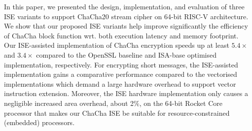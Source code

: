 In this paper, we presented the design, implementation, and evaluation of three ISE variants to support ChaCha20 stream cipher on 64-bit RISC-V architecture.
We show that our proposed ISE variants help improve significantly the efficiency of ChaCha block function wrt. both execution latency and memory footprint.  
Our ISE-assisted implementation of ChaCha encryption speeds up at least $5.4\times$ and $3.4\times$ compared to the OpenSSL baseline and ISA-base optimised implementation, respectively. 
For encrypting short messages, the ISE-assisted implementation gains a comparative performance compared to the vectorised implementations which demand a large hardware overhead to support vector instruction extension.
Moreover, the ISE hardware implementation only causes a negligible increased area overhead, about 2\%, on the 64-bit Rocket Core processor that makes our ChaCha ISE be suitable for resource-constrained (embedded) processors.




